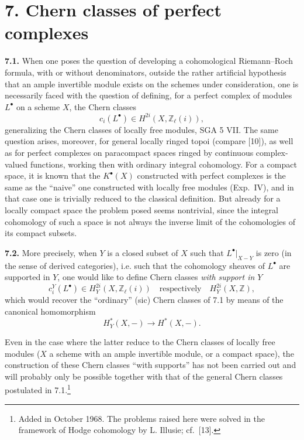 \documentclass[11pt]{article}
\newcommand{\Z}{\mathbb Z}
\newcommand{\Zell}{\mathbb Z_{\ell}}
\begin{document}
\section*{7. Chern classes of perfect complexes}

\noindent\textbf{7.1.}
When one poses the question of developing a cohomological Riemann--Roch
formula, with or without denominators, outside the rather artificial
hypothesis that an ample invertible module exists on the schemes under
consideration, one is necessarily faced with the question of defining, for
a perfect complex of modules $L^\bullet$ on a scheme $X$, the Chern classes
\[
 c_i(L^\bullet)\in H^{2i}(X,\Zell(i)),
\]
generalizing the Chern classes of locally free modules, SGA 5 VII. The same
question arises, moreover, for general locally ringed topoi (compare [10]),
as well as for perfect complexes on paracompact spaces ringed by continuous
complex-valued functions, working then with ordinary integral cohomology.
For a compact space, it is known that the $K^\bullet(X)$ constructed with
perfect complexes is the same as the ``naive'' one constructed with locally
free modules (Exp.~IV), and in that case one is trivially reduced to the
classical definition. But already for a locally compact space the problem
posed seems nontrivial, since the integral cohomology of such a space is not
always the inverse limit of the cohomologies of its compact subsets.

\noindent\textbf{7.2.}
More precisely, when $Y$ is a closed subset of $X$ such that
$L^\bullet|_{X-Y}$ is zero (in the sense of derived categories), i.e. such
that the cohomology sheaves of $L^\bullet$ are supported in $Y$, one would
like to define Chern classes \emph{with support in $Y$}
\[
 c_i^Y(L^\bullet)\in H_Y^{2i}(X,\Zell(i))
 \quad\text{respectively}\quad H_Y^{2i}(X,\Z),
\]
which would recover the ``ordinary'' (sic) Chern classes of 7.1 by means of
the canonical homomorphism
\[
 H_Y^*(X,-)\longrightarrow H^*(X,-).
\]

Even in the case where the latter reduce to the Chern classes of locally
free modules ($X$ a scheme with an ample invertible module, or a compact
space), the construction of these Chern classes ``with supports'' has not
been carried out and will probably only be possible together with that of
the general Chern classes postulated in 7.1.\footnote{Added in October 1968.
The problems raised here were solved in the framework of Hodge cohomology by
L. Illusie; cf.~[13].}
\end{document}
